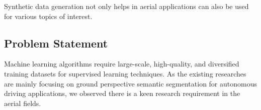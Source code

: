 \documentclass[../report.tex]{subfiles}
\begin{document}
    Synthetic data generation not only helps in aerial applications can also be used for various topics of interest. 
    

    
    
    



    \subsection{Problem Statement}
    \label{sec:introduction:problem_statement}

    Machine learning algorithms require large-scale, high-quality, and diversified training datasets for supervised learning techniques. As the existing researches are mainly focusing on ground perspective semantic segmentation for autonomous driving applications, we observed there is a keen research requirement in the aerial fields.  
\end{document}
